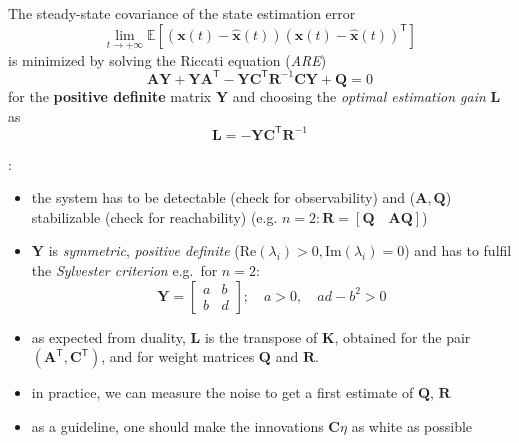 
The steady-state covariance of the state estimation error
\begin{equation*}
    \lim_{t\to+\infty}\mathbb{E}\left[(\mathbf{x}(t)-\hat{\mathbf{x}}(t)){(\mathbf{x}(t)-\hat{\mathbf{x}}(t))}^{\mathsf{T}}\right]
\end{equation*}
is minimized by solving the Riccati equation (\textit{ARE})
\begin{equation*}
    \mathbf{AY}+\mathbf{YA}^{\mathsf{T}}-\mathbf{YC}^{\mathsf{T}} \mathbf{R}^{-1}\mathbf{CY}+\mathbf{Q}=0
\end{equation*}
for the \textbf{positive definite} matrix $\mathbf{Y}$ and choosing the \textit{optimal estimation gain} $\mathbf{L}$ as
\begin{equation*}
    \mathbf{L}=-\mathbf{YC}^{\mathsf{T}} \mathbf{R}^{-1}
\end{equation*}

:

\begin{itemize}
    \item the system has to be detectable (check for observability) and ($\mathbf{A,Q}$) stabilizable (check for reachability)\newline
          (e.g. $n=2: \mathbf{R}= \left[\mathbf{Q}\quad \mathbf{AQ}\right]$)
    \item $\mathbf{Y}$ is \textit{symmetric}, \textit{positive definite} ($\mathrm{Re}(\lambda_i) > 0, \mathrm{Im}(\lambda_i) = 0$) and has to fulfil the \textit{Sylvester criterion} e.g.\ for $n=2$:
          \noindent\begin{equation*}
              \mathbf{Y}=\begin{bmatrix}
                  a & b \\
                  b & d
              \end{bmatrix}; \quad a>0, \quad ad-b^2>0
          \end{equation*}
    \item as expected from duality, $\mathbf{L}$ is the transpose of $\mathbf{K}$, obtained for the pair $(\mathbf{A}^{\mathsf{T}}, \mathbf{C}^{\mathsf{T}})$, and for weight matrices $\mathbf{Q}$ and $\mathbf{R}$.
    \item in practice, we can measure the noise to get a first estimate of $\mathbf{Q}$, $\mathbf{R}$
    \item as a guideline, one should make the innovations $\mathbf{C}\eta$ as white as possible
\end{itemize}
